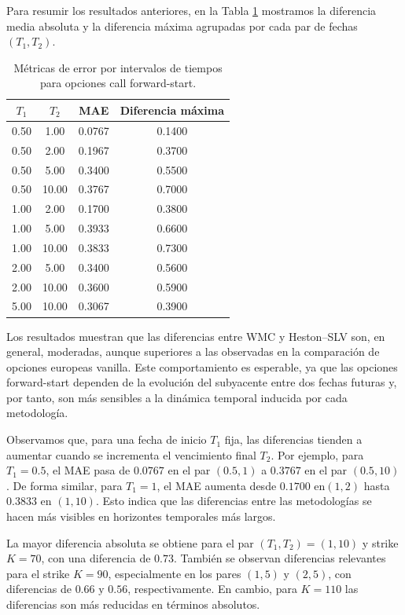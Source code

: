 Para resumir los resultados anteriores, en la Tabla
\ref{tab:comparacion_forward_start_call_metricas} mostramos la diferencia media
absoluta y la diferencia máxima agrupadas por cada par de fechas \((T_1,T_2)\).

\begin{table}[H]
\centering
\begin{tabular}{|c|c|c|c|}
\hline
\(T_1\) & \(T_2\) & MAE & Diferencia máxima \\
\hline
0.50 & 1.00  & 0.0767 & 0.1400 \\
0.50 & 2.00  & 0.1967 & 0.3700 \\
0.50 & 5.00  & 0.3400 & 0.5500 \\
0.50 & 10.00 & 0.3767 & 0.7000 \\
1.00 & 2.00  & 0.1700 & 0.3800 \\
1.00 & 5.00  & 0.3933 & 0.6600 \\
1.00 & 10.00 & 0.3833 & 0.7300 \\
2.00 & 5.00  & 0.3400 & 0.5600 \\
2.00 & 10.00 & 0.3600 & 0.5900 \\
5.00 & 10.00 & 0.3067 & 0.3900 \\
\hline
\end{tabular}
\caption{Métricas de error por intervalos de tiempos para opciones call forward-start.}
\label{tab:comparacion_forward_start_call_metricas}
\end{table}

Los resultados muestran que las diferencias entre WMC y Heston--SLV son, en
general, moderadas, aunque superiores a las observadas en la comparación de
opciones europeas vanilla. Este comportamiento es esperable, ya que las opciones
forward-start dependen de la evolución del subyacente entre dos fechas futuras y,
por tanto, son más sensibles a la dinámica temporal inducida por cada metodología.\medskip

Observamos que, para una fecha de inicio $T_1$ fija, las diferencias tienden a aumentar
cuando se incrementa el vencimiento final $T_2$. Por ejemplo, para $T_1=0.5$,
el MAE pasa de $0.0767$ en el par $(0.5,1)$ a $0.3767$ en el par
$(0.5,10)$. De forma similar, para $T_1=1$, el MAE aumenta desde $0.1700$
en$ (1,2)$ hasta $0.3833$ en $(1,10)$. Esto indica que las diferencias entre
las metodologías se hacen más visibles en horizontes temporales más largos.\medskip

La mayor diferencia absoluta se obtiene para el par \((T_1,T_2)=(1,10)\) y strike
$K=70$, con una diferencia de $0.73$. También se observan diferencias relevantes
para el strike $K = 90$, especialmente en los pares $(1,5) \text{ y } (2,5)$, con diferencias
de $0.66 \text{ y } 0.56$, respectivamente. En cambio, para $K=110$ las diferencias
son más reducidas en términos absolutos.\medskip

